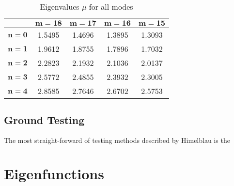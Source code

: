 \documentclass[]{aiaa-tc}%
\begin{document}
\begin{table}[htb]
\begin{centering}
\begin{tabular}{| c | c c c c |}
\hline
{} &  $\mathbf{m=18}$ &  $\mathbf{m=17}$ &  $\mathbf{m=16}$ &  $\mathbf{m=15}$ \\
\hline
$\mathbf{n=0}$ &       1.5495 &         1.4696 &         1.3895 &         1.3093 \\
$\mathbf{n=1}$ &       1.9612 &         1.8755 &         1.7896 &         1.7032 \\
$\mathbf{n=2}$ &       2.2823 &         2.1932 &         2.1036 &         2.0137 \\
$\mathbf{n=3}$ &       2.5772 &         2.4855 &         2.3932 &         2.3005 \\
$\mathbf{n=4}$ &       2.8585 &         2.7646 &         2.6702 &         2.5753 \\
\hline
\end{tabular}
\caption{Eigenvalues $\mu$ for all modes}
\end{centering}
\end{table}




\subsection{Ground Testing}

The most straight-forward of testing methods described by Himelblau is the










\section{Eigenfunctions}
\end{document}
